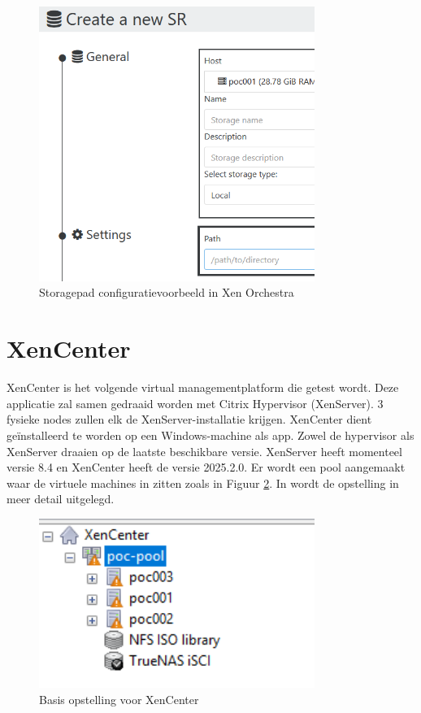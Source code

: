 \begin{figure}[H]
  \centering
  \includegraphics[width=0.8\textwidth]{../poc/storage-path-orch.png}
  \caption{Storagepad configuratievoorbeeld in Xen Orchestra}
  \label{fig:storage-path-orch}  
\end{figure}
\section{XenCenter}%
XenCenter is het volgende virtual managementplatform die getest wordt. Deze applicatie zal samen gedraaid worden met Citrix Hypervisor (XenServer).
3 fysieke nodes zullen elk de XenServer-installatie krijgen. XenCenter dient geïnstalleerd te worden op een Windows-machine als app.
Zowel de hypervisor als XenServer draaien op de laatste beschikbare versie. XenServer heeft momenteel versie 8.4 en XenCenter heeft de versie 2025.2.0.
Er wordt een pool aangemaakt waar de virtuele machines in zitten zoals in Figuur \ref{fig:opstel-xen}.
In  wordt de opstelling in meer detail uitgelegd.
\begin{figure}[H]
\centering
\includegraphics[width=0.8\textwidth]{../poc/opstel-xen.png}
\caption{Basis opstelling voor XenCenter}
\label{fig:opstel-xen}
\end{figure}

